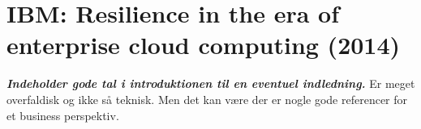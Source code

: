 \section{IBM: Resilience in the era of enterprise cloud computing (2014)}

\textbf{\textit{Indeholder gode tal i introduktionen til en eventuel indledning.}}
Er meget overfaldisk og ikke så teknisk. Men det kan være der er nogle gode referencer for et business perspektiv.
